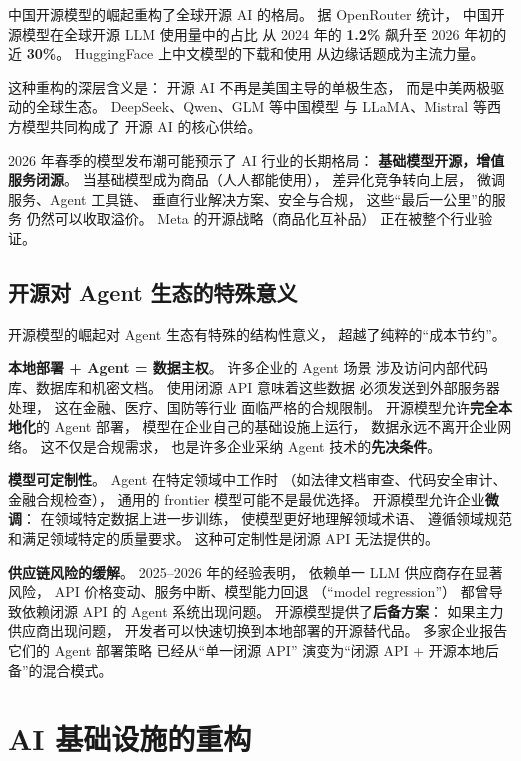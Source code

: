 中国开源模型的崛起重构了全球开源 AI 的格局。
据 OpenRouter 统计，
中国开源模型在全球开源 LLM 使用量中的占比
从 2024 年的 \textbf{1.2\%} 飙升至 2026 年初的近 \textbf{30\%}。
HuggingFace 上中文模型的下载和使用
从边缘话题成为主流力量。

这种重构的深层含义是：
开源 AI 不再是美国主导的单极生态，
而是中美两极驱动的全球生态。
DeepSeek、Qwen、GLM 等中国模型
与 LLaMA、Mistral 等西方模型共同构成了
开源 AI 的核心供给。

\begin{corebox}[开源的长期格局预测]
2026 年春季的模型发布潮可能预示了
AI 行业的长期格局：
\textbf{基础模型开源，增值服务闭源}。
当基础模型成为商品（人人都能使用），
差异化竞争转向上层，
微调服务、Agent 工具链、
垂直行业解决方案、安全与合规，
这些“最后一公里”的服务
仍然可以收取溢价。
Meta 的开源战略（商品化互补品）
正在被整个行业验证。
\end{corebox}

\subsection{开源对 Agent 生态的特殊意义}

开源模型的崛起对 Agent 生态有特殊的结构性意义，
超越了纯粹的“成本节约”。

\textbf{本地部署 + Agent = 数据主权}。
许多企业的 Agent 场景
涉及访问内部代码库、数据库和机密文档。
使用闭源 API 意味着这些数据
必须发送到外部服务器处理，
这在金融、医疗、国防等行业
面临严格的合规限制。
开源模型允许\textbf{完全本地化}的 Agent 部署，
模型在企业自己的基础设施上运行，
数据永远不离开企业网络。
这不仅是合规需求，
也是许多企业采纳 Agent 技术的\textbf{先决条件}。

\textbf{模型可定制性}。
Agent 在特定领域中工作时
（如法律文档审查、代码安全审计、金融合规检查），
通用的 frontier 模型可能不是最优选择。
开源模型允许企业\textbf{微调}：
在领域特定数据上进一步训练，
使模型更好地理解领域术语、
遵循领域规范和满足领域特定的质量要求。
这种可定制性是闭源 API 无法提供的。

\textbf{供应链风险的缓解}。
2025--2026 年的经验表明，
依赖单一 LLM 供应商存在显著风险，
API 价格变动、服务中断、模型能力回退
（“model regression”）
都曾导致依赖闭源 API 的 Agent 系统出现问题。
开源模型提供了\textbf{后备方案}：
如果主力供应商出现问题，
开发者可以快速切换到本地部署的开源替代品。
多家企业报告它们的 Agent 部署策略
已经从“单一闭源 API”
演变为“闭源 API + 开源本地后备”的混合模式。


\section{AI 基础设施的重构}
\label{sec:ai-infra-restructuring}

